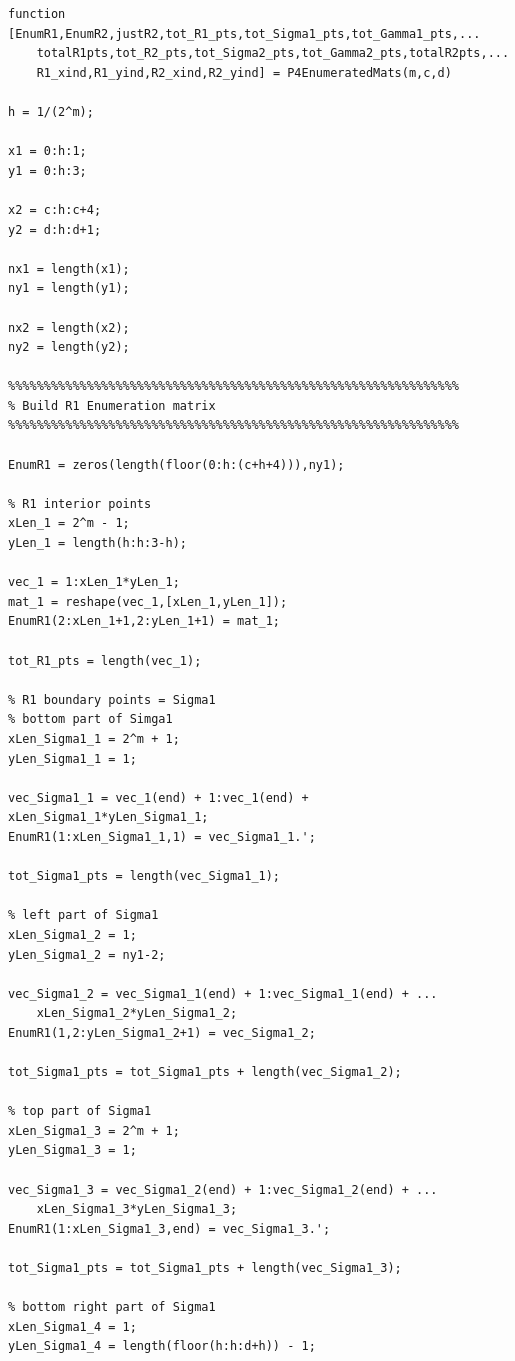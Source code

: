 \documentclass[12pt]{article}
\begin{document}
\lstset{language=matlab,frame=single}
\begin{lstlisting}[caption=Enumeration for all a and b values]
function [EnumR1,EnumR2,justR2,tot_R1_pts,tot_Sigma1_pts,tot_Gamma1_pts,...
    totalR1pts,tot_R2_pts,tot_Sigma2_pts,tot_Gamma2_pts,totalR2pts,...
    R1_xind,R1_yind,R2_xind,R2_yind] = P4EnumeratedMats(m,c,d)

h = 1/(2^m);

x1 = 0:h:1;
y1 = 0:h:3;

x2 = c:h:c+4;
y2 = d:h:d+1;

nx1 = length(x1); 
ny1 = length(y1); 

nx2 = length(x2); 
ny2 = length(y2); 

%%%%%%%%%%%%%%%%%%%%%%%%%%%%%%%%%%%%%%%%%%%%%%%%%%%%%%%%%%%%%%%
% Build R1 Enumeration matrix
%%%%%%%%%%%%%%%%%%%%%%%%%%%%%%%%%%%%%%%%%%%%%%%%%%%%%%%%%%%%%%%

EnumR1 = zeros(length(floor(0:h:(c+h+4))),ny1);

% R1 interior points
xLen_1 = 2^m - 1;
yLen_1 = length(h:h:3-h); 

vec_1 = 1:xLen_1*yLen_1;
mat_1 = reshape(vec_1,[xLen_1,yLen_1]);
EnumR1(2:xLen_1+1,2:yLen_1+1) = mat_1;

tot_R1_pts = length(vec_1);

% R1 boundary points = Sigma1
% bottom part of Simga1
xLen_Sigma1_1 = 2^m + 1;
yLen_Sigma1_1 = 1;

vec_Sigma1_1 = vec_1(end) + 1:vec_1(end) + xLen_Sigma1_1*yLen_Sigma1_1;
EnumR1(1:xLen_Sigma1_1,1) = vec_Sigma1_1.';

tot_Sigma1_pts = length(vec_Sigma1_1);

% left part of Sigma1
xLen_Sigma1_2 = 1;
yLen_Sigma1_2 = ny1-2;

vec_Sigma1_2 = vec_Sigma1_1(end) + 1:vec_Sigma1_1(end) + ...
    xLen_Sigma1_2*yLen_Sigma1_2;
EnumR1(1,2:yLen_Sigma1_2+1) = vec_Sigma1_2;

tot_Sigma1_pts = tot_Sigma1_pts + length(vec_Sigma1_2);

% top part of Sigma1
xLen_Sigma1_3 = 2^m + 1;
yLen_Sigma1_3 = 1;

vec_Sigma1_3 = vec_Sigma1_2(end) + 1:vec_Sigma1_2(end) + ...
    xLen_Sigma1_3*yLen_Sigma1_3;
EnumR1(1:xLen_Sigma1_3,end) = vec_Sigma1_3.';

tot_Sigma1_pts = tot_Sigma1_pts + length(vec_Sigma1_3);

% bottom right part of Sigma1
xLen_Sigma1_4 = 1;
yLen_Sigma1_4 = length(floor(h:h:d+h)) - 1;


\end{lstlisting}
\end{document}
